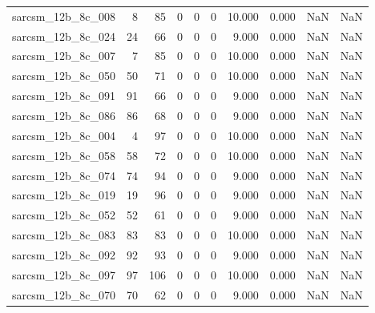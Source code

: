 \documentclass{article}
\begin{document}
\begin{longtable}{lrrrrrrrrr}
sarcsm\_12b\_8c\_008 & 8 & 85 & 0 & 0 & 0 & 10.000 & 0.000 & NaN & NaN \\
sarcsm\_12b\_8c\_024 & 24 & 66 & 0 & 0 & 0 & 9.000 & 0.000 & NaN & NaN \\
sarcsm\_12b\_8c\_007 & 7 & 85 & 0 & 0 & 0 & 10.000 & 0.000 & NaN & NaN \\
sarcsm\_12b\_8c\_050 & 50 & 71 & 0 & 0 & 0 & 10.000 & 0.000 & NaN & NaN \\
sarcsm\_12b\_8c\_091 & 91 & 66 & 0 & 0 & 0 & 9.000 & 0.000 & NaN & NaN \\
sarcsm\_12b\_8c\_086 & 86 & 68 & 0 & 0 & 0 & 9.000 & 0.000 & NaN & NaN \\
sarcsm\_12b\_8c\_004 & 4 & 97 & 0 & 0 & 0 & 10.000 & 0.000 & NaN & NaN \\
sarcsm\_12b\_8c\_058 & 58 & 72 & 0 & 0 & 0 & 10.000 & 0.000 & NaN & NaN \\
sarcsm\_12b\_8c\_074 & 74 & 94 & 0 & 0 & 0 & 9.000 & 0.000 & NaN & NaN \\
sarcsm\_12b\_8c\_019 & 19 & 96 & 0 & 0 & 0 & 9.000 & 0.000 & NaN & NaN \\
sarcsm\_12b\_8c\_052 & 52 & 61 & 0 & 0 & 0 & 9.000 & 0.000 & NaN & NaN \\
sarcsm\_12b\_8c\_083 & 83 & 83 & 0 & 0 & 0 & 10.000 & 0.000 & NaN & NaN \\
sarcsm\_12b\_8c\_092 & 92 & 93 & 0 & 0 & 0 & 9.000 & 0.000 & NaN & NaN \\
sarcsm\_12b\_8c\_097 & 97 & 106 & 0 & 0 & 0 & 10.000 & 0.000 & NaN & NaN \\
sarcsm\_12b\_8c\_070 & 70 & 62 & 0 & 0 & 0 & 9.000 & 0.000 & NaN & NaN \\
\end{longtable}
\end{document}
